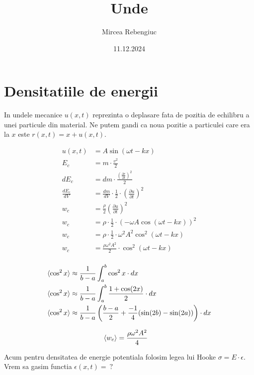 \documentclass{article}
\title{Unde}
\author{Mircea Rebengiuc}
\date{11.12.2024}
\begin{document}
\maketitle

\section{Densitatiile de energii}

In undele mecanice $u(x, t)$ reprezinta o deplasare fata de pozitia de echilibru a unei particule din material. Ne putem gandi ca noua pozitie a particulei care era la $x$ este $r(x, t) = x + u(x, t)$.

\begin{align*}
    u(x, t) &= A\sin(\omega t - kx) \\
    E_c &= m\cdot \frac{v^2}{2} \\
    dE_c &= dm \cdot \frac{(\frac{\partial r}{\partial t})^2}{2} \\
    \frac{dE_c}{dV} &= \frac{dm}{dV}\cdot \frac{1}{2}\cdot (\frac{\partial u}{\partial t})^2 \\
    w_c &= \frac{\rho}{2}\left(\frac{\partial u}{\partial t}\right)^2\\
    w_c &= \rho\cdot \frac{1}{2}\cdot (-\omega A\cos(\omega t - kx))^2 \\
    w_c &= \rho\cdot \frac{1}{2}\cdot \omega^2 A^2\cos^2(\omega t - kx) \\
    w_c &= \frac{\rho\omega^2 A^2}{2}\cdot \cos^2(\omega t - kx) \\
\end{align*}

\begin{align*}
    \braket{\cos^2x} &\approx \frac{1}{b-a}\int_a^b\cos^2x\cdot dx \\
    \braket{\cos^2x} &\approx \frac{1}{b-a}\int_a^b\frac{1+\cos(2x)}{2}\cdot dx \\
    \braket{\cos^2x} &\approx \frac{1}{b-a}\left(\frac{b-a}{2}+\frac{-1}{4}(\sin(2b) - \sin(2a))\right)\cdot dx \\
\end{align*}

\begin{align*}
    \braket{w_c} &= \frac{\rho\omega^2 A^2}{4}
\end{align*}

Acum pentru densitatea de energie potentiala folosim legea lui Hooke $\sigma = E\cdot \epsilon$. Vrem sa gasim functia $\epsilon(x, t) = \:?$
\end{document}
